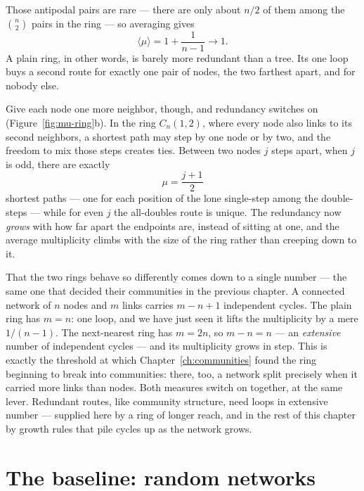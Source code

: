 Those antipodal pairs are rare --- there are only about $n/2$ of them among the
$\binom{n}{2}$ pairs in the ring --- so averaging gives
\begin{equation}
  \langle\mu\rangle = 1 + \frac{1}{n-1} \longrightarrow 1 .
  \label{eq:mu-ring}
\end{equation}
A plain ring, in other words, is barely more redundant than a tree. Its one loop
buys a second route for exactly one pair of nodes, the two farthest apart, and for
nobody else.

Give each node one more neighbor, though, and redundancy switches on
(Figure~\ref{fig:mu-ring}b). In the ring $C_n(1,2)$, where every node also links
to its second neighbors, a shortest path may step by one node or by two, and the
freedom to mix those steps creates ties. Between two nodes $j$ steps apart, when
$j$ is odd, there are exactly
\begin{equation}
  \mu = \frac{j+1}{2}
  \label{eq:mu-ring2}
\end{equation}
shortest paths --- one for each position of the lone single-step among the
double-steps --- while for even $j$ the all-doubles route is unique. The redundancy
now \emph{grows} with how far apart the endpoints are, instead of sitting at one,
and the average multiplicity climbs with the size of the ring rather than creeping
down to it.

That the two rings behave so differently comes down to a single number --- the same
one that decided their communities in the previous chapter. A connected network of
$n$ nodes and $m$ links carries $m-n+1$ independent cycles. The plain ring has
$m=n$: one loop, and we have just seen it lifts the multiplicity by a mere
$1/(n-1)$. The next-nearest ring has $m=2n$, so $m-n=n$ --- an \emph{extensive}
number of independent cycles --- and its multiplicity grows in step. This is
exactly the threshold at which Chapter~\ref{ch:communities} found the ring
beginning to break into communities: there, too, a network split precisely when it
carried more links than nodes. Both measures switch on together, at the same
lever. Redundant routes, like community structure, need loops in extensive number
--- supplied here by a ring of longer reach, and in the rest of this chapter by
growth rules that pile cycles up as the network grows.

\section{The baseline: random networks}

